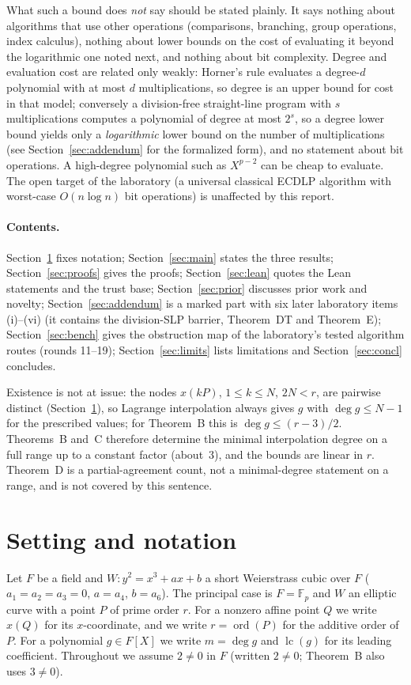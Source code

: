 \documentclass[11pt,a4paper]{article}
\theoremstyle{remark}
\newcommand{\F}{\mathbb{F}}
\newcommand{\lc}{\operatorname{lc}}
\begin{document}
What such a bound does \emph{not} say should be stated plainly. It says nothing about algorithms that use
other operations (comparisons, branching, group operations, index calculus), nothing about
lower bounds on the cost of evaluating it beyond the logarithmic one noted next, and nothing about bit complexity. Degree and evaluation cost are related only weakly:
Horner's rule evaluates a degree-$d$ polynomial with at most $d$ multiplications, so degree is an upper bound for cost in that model;
conversely a division-free straight-line program with $s$ multiplications computes a polynomial of degree at most $2^s$, so
a degree lower bound yields only a \emph{logarithmic} lower bound on the number of multiplications (see Section~\ref{sec:addendum} for the formalized form),
and no statement about bit operations. A high-degree polynomial such as $X^{p-2}$ can be cheap to evaluate. The open target of the laboratory
(a universal classical ECDLP algorithm with worst-case $O(n\log n)$ bit operations)
is unaffected by this report.

\paragraph{Contents.} Section~\ref{sec:setting} fixes notation; Section~\ref{sec:main} states the three
results; Section~\ref{sec:proofs} gives the proofs; Section~\ref{sec:lean} quotes the Lean statements and the
trust base; Section~\ref{sec:prior} discusses prior work and novelty; Section~\ref{sec:addendum} is a marked part with six later laboratory items (i)--(vi)
(it contains the division-SLP barrier, Theorem~DT and Theorem~E); Section~\ref{sec:bench} gives the obstruction map of the laboratory's tested algorithm routes (rounds 11--19); Section~\ref{sec:limits} lists limitations and Section~\ref{sec:concl} concludes.

Existence is not at issue: the nodes $x(kP)$, $1\le k\le N$, $2N<r$, are pairwise distinct (Section~\ref{sec:setting}), so Lagrange interpolation always gives
$g$ with $\deg g\le N-1$ for the prescribed values; for Theorem~B this is $\deg g\le (r-3)/2$. Theorems~B and~C therefore determine the minimal
interpolation degree on a full range up to a constant factor (about~$3$), and the bounds are linear in $r$. Theorem~D is a partial-agreement count,
not a minimal-degree statement on a range, and is not covered by this sentence.

\section{Setting and notation}\label{sec:setting}
Let $F$ be a field and $W: y^2=x^3+ax+b$ a short Weierstrass cubic over $F$ ($a_1=a_2=a_3=0$, $a=a_4$,
$b=a_6$). The principal case is $F=\F_p$ and $W$ an elliptic curve with a point $P$ of prime order $r$. For a
nonzero affine point $Q$ we write $x(Q)$ for its $x$-coordinate, and we write $r=\operatorname{ord}(P)$ for the additive order
of $P$. For a polynomial $g\in F[X]$ we write $m=\deg g$ and $\lc(g)$ for its leading coefficient. Throughout
we assume $2\ne0$ in $F$ (written $2\neq0$; Theorem~B also uses $3\neq0$).
\end{document}
